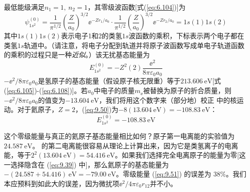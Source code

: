     最低能级满足$n_1 = 1,\: n_2 = 1$，其零级波函数[式(\ref{eq:6.104})]为
    \begin{equation}
        \psi_{1s^2}^{\left(0\right)} = \frac{1}{\pi^{1/2}}\left(\frac{Z}{a_0}\right)^{3/2} \ee ^{-Zr_1/a_0} \cdot \frac{1}{\pi^{1/2}}\left(\frac{Z}{a_0}\right)^{3/2} \ee ^{-Zr_2/a_0} = 1s\left(1\right)1s\left(2\right)
        \label{eq:9.49}
    \end{equation}
    其中$1s\left(1\right)1s\left(2\right)$表示电子1和2的类氢$1s$波函数的乘积，下标表示两个电子都在类氢$1s$轨道中。（请注意，将电子分配到轨道并将原子波函数写成单电子轨道函数的乘积的过程只是一种\textit{近似}。）该无扰基态能量为
    \begin{equation}
        E^{\left(0\right)}_{1s^2} = -Z^2\left(2\right)\frac{\ee ^2}{8\pi\varepsilon_0a_0}
        \label{eq:9.50}
    \end{equation}
    $-\ee ^2 / 8\pi\varepsilon_0a_0$是氢原子的基态能量（假设原子核无限重）等于$213.606 \: \mathrm{eV}$[式(\ref{eq:6.105})-(\ref{eq:6.108})]。若$a_0$中电子的质量$m_{\ee }$被替换为原子的折合质量，则$-\ee ^2 / 8\pi\varepsilon_0a_0$的值变为$-13.604 \: \mathrm{eV}$，我们将用这个数字来（部分地）校正  中的核运动。对于氦原子，$Z=2$，(\ref{eq:9.50})为$-8\left(13.604 \: \mathrm{eV}\right) = -108.83 \: \mathrm{eV}$：
    \begin{equation}
        E^{\left(0\right)}_{1s^2} = -108.83 \: \mathrm{eV}
        \label{eq:9.51}
    \end{equation}

    这个零级能量与真正的氦原子基态能量相比如何？原子第一电离能的实验值为$24.587 \: \mathrm{eV}$。 的第二电离能很容易从理论上计算出来，因为它是类氢离子的电离能，等于$2^2\left(13.604 \: \mathrm{eV}\right) = 54.416 \: \mathrm{eV}$。如果我们选择完全电离原子的能量为零[这一选择隐含在 (\ref{eq:9.39}) 中]，那么氦原子的基态能量为$-\left(24.587 + 54.416\right) \: \mathrm{eV} = -79.00 \: \mathrm{eV}$。零级能量 (\ref{eq:9.51}) 的误差为 $38\%$。我们本应预料到如此大的误差，因为微扰项$\ee ^2 / 4\pi\varepsilon_0r_{12}$并不小。

